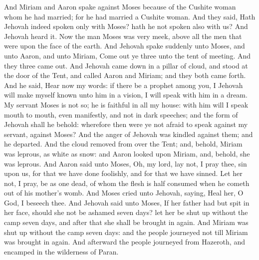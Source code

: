 And Miriam and Aaron spake against Moses because of the Cushite woman whom he had married; for he had married a Cushite woman. And they said, Hath Jehovah indeed spoken only with Moses? hath he not spoken also with us? And Jehovah heard it. Now the man Moses was very meek, above all the men that were upon the face of the earth.  And Jehovah spake suddenly unto Moses, and unto Aaron, and unto Miriam, Come out ye three unto the tent of meeting. And they three came out. And Jehovah came down in a pillar of cloud, and stood at the door of the Tent, and called Aaron and Miriam; and they both came forth. And he said, Hear now my words: if there be a prophet among you, I Jehovah will make myself known unto him in a vision, I will speak with him in a dream. My servant Moses is not so; he is faithful in all my house: with him will I speak mouth to mouth, even manifestly, and not in dark speeches; and the form of Jehovah shall he behold: wherefore then were ye not afraid to speak against my servant, against Moses?  And the anger of Jehovah was kindled against them; and he departed. And the cloud removed from over the Tent; and, behold, Miriam was leprous, as white as snow: and Aaron looked upon Miriam, and, behold, she was leprous. And Aaron said unto Moses, Oh, my lord, lay not, I pray thee, sin upon us, for that we have done foolishly, and for that we have sinned. Let her not, I pray, be as one dead, of whom the flesh is half consumed when he cometh out of his mother’s womb. And Moses cried unto Jehovah, saying, Heal her, O God, I beseech thee. And Jehovah said unto Moses, If her father had but spit in her face, should she not be ashamed seven days? let her be shut up without the camp seven days, and after that she shall be brought in again. And Miriam was shut up without the camp seven days: and the people journeyed not till Miriam was brought in again.  And afterward the people journeyed from Hazeroth, and encamped in the wilderness of Paran. 


